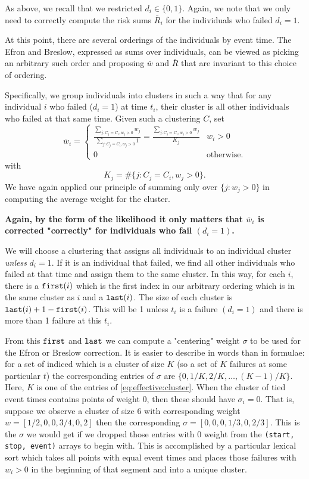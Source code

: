 \documentclass{article}
\begin{document}
As above, we recall that we restricted $d_i \in \{0,1\}$. Again,
we note that we only need
to correctly compute the risk sums $\bar{R}_i$ 
for the individuals who failed $d_i=1$.

At this point, there are several orderings of the individuals by event time. The Efron and Breslow, expressed as sums over individuals, can be viewed as picking an arbitrary such order and 
proposing $\bar{w}$ and $\bar{R}$ that are invariant to this
choice of ordering.

Specifically, we group individuals
into clusters in such a way that for any individual $i$
who failed ($d_i=1$) at time $t_i$, their cluster
is all other individuals who failed at that same time.
Given such a clustering $C$, set
\begin{equation}
    \label{eq:avg:weight}
    \bar{w}_i = \begin{cases} \frac{\sum_{j:C_j=C_i, w_j>0} w_j}{\sum_{j:C_j=C_i, w_j>0} 1} = \frac{\sum_{j:C_j=C_i, w_j>0} w_j}{K_j} & w_i > 0 \\
    0  & \text{otherwise.}
    \end{cases}
\end{equation}
with
\begin{equation}
    \label{eq:effective:cluster}
K_j = \# \{j:C_j=C_i, w_j>0\}.
\end{equation}
We have again applied our principle of summing only over $\{j:w_j>0\}$ in computing the average weight for the cluster.

{\bf Again, by the form of the likelihood it only matters that $\bar{w}_i$ is corrected "correctly" for individuals
who fail $(d_i=1)$.}

We will choose a clustering that assigns all individuals
to an individual cluster {\em unless} $d_i=1$. If it is an individual that failed, we find all other individuals who failed at that time and assign them to the same cluster. In this way, for each $i$, there is a ${\tt first}(i)$ which is the
first index in our arbitrary ordering which is in the same cluster as $i$ and a ${\tt last}(i)$. The size of each cluster is ${\tt last}(i) + 1 - {\tt first}(i)$. This will be 1 unless $t_i$ is a failure $(d_i=1)$ and there is more than 1 failure at this $t_i$.

From this ${\tt first}$ and ${\tt last}$ we can compute
a "centering" weight $\sigma$ to be used for the Efron or Breslow 
correction. It is easier to describe in words
than in formulae: for a set of indiced which is a cluster of size $K$ (so a set of $K$ failures at some particular $t$) the corresponding entries of $\sigma$ are $\{0,1/K,2/K,\dots,(K-1)/K\}.$ Here, 
$K$ is one of the entries of \eqref{eq:effective:cluster}. When the cluster of tied event times contains points of weight 0, then these should have $\sigma_i=0$. That is, suppose we
observe a cluster of size 6 with corresponding weight $w=[1/2,0,0,3/4,0,2]$ then the corresponding
$\sigma=[0,0,0,1/3,0,2/3]$. This is the $\sigma$ we would get if we dropped those entries with 0 weight from the \texttt{(start, stop, event)} arrays to begin with.
This is accomplished by a particular lexical sort which takes all points with equal event times and places those failures with $w_i>0$ in the beginning
of that segment and into a unique cluster.
\end{document}
